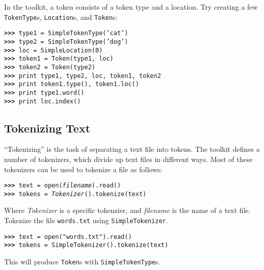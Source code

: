 \documentclass[11pt]{article}
\begin{document}
\noindent
In the toolkit, a token consists of a token type and a location.  Try
creating a few \texttt{TokenType}s, \texttt{Location}s, and
\texttt{Token}s:  

\noindent\begin{tabbing}
\tt\textbf{>>>} type1 = SimpleTokenType('cat') \\
\tt\textbf{>>>} type2 = SimpleTokenType('dog') \\
\tt\textbf{>>>} loc = SimpleLocation(0) \\
\tt\textbf{>>>} token1 = Token(type1, loc) \\
\tt\textbf{>>>} token2 = Token(type2) \\
\tt\textbf{>>>} print type1, type2, loc, token1, token2 \\
\tt\textbf{>>>} print token1.type(), token1.loc() \\
\tt\textbf{>>>} print type1.word() \\
\tt\textbf{>>>} print loc.index() \\
\end{tabbing}

\subsection{Tokenizing Text}

``Tokenizing'' is the task of separating a text file into tokens.  The 
toolkit defines a number of tokenizers, which divide up text files in
different ways.  Most of these tokenizers can be used to tokenize a
file as follows:

\noindent\begin{tabbing}
\tt\textbf{>>>} text = open(\textrm{\textit{filename}}).read() \\
\tt\textbf{>>>} tokens = \textrm{\textit{Tokenizer}}().tokenize(text)
\end{tabbing}

\noindent
Where \textit{Tokenizer} is a specific tokenzier, and
\textit{filename} is the name of a text file. Tokenize the file
\texttt{words.txt} using \texttt{SimpleTokenizer}. 

\noindent\begin{tabbing}
\tt\textbf{>>>} text = open("words.txt").read() \\
\tt\textbf{>>>} tokens = SimpleTokenizer().tokenize(text)
\end{tabbing}

\noindent
This will produce \texttt{Token}s with \texttt{SimpleTokenType}s.
\end{document}
